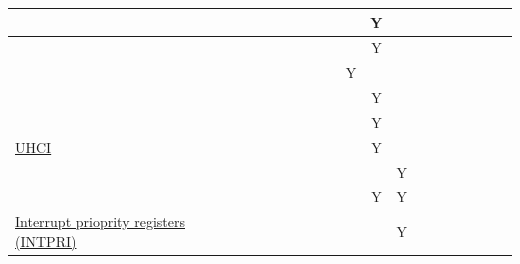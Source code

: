 \documentclass[main\_\_EN.tex]{subfiles}
\begin{document}
\begin{landscape}
\begin{tiny}
\begin{longtable}[c]{|m{3cm}|c|c|c|c|c|c|c|c|c|C{1.4cm}|c|c|c|c|c|c|c|c|c| }
     &  &  &  &  &  &  &  &  &  &  &  Y &  &  &  &  &  &  \\ \hline
     &  &  &  &  &  &  &  &  &  &  &  Y &  &  &  &  &  &  \\ \hline
     &  &  &  &  &  &  &  &  &  &  Y &  &  &  &  &  &  &  \\ \hline
     &  &  &  &  &  &  &  &  &  &  &  Y &  &  &  &  &  &  \\ \hline
     &  &  &  &  &  &  &  &  &  &  &  Y &  &  &  &  &  &  \\ \hline
    \hyperref[mod:uart]{UHCI} &  &  &  &  &  &  &  &  &  &  &  Y &  &  &  &  &  &  \\ \hline
     &  &  &  &  &  &  &  &  &  &  &  &  Y &  &  &  &  &  \\ \hline
      &  &  &  &  &  &  &  &  &  &  & Y & Y &  &  &  &  &  \\ \hline
    \hyperref[mod:riscvcpu]{Interrupt prioprity registers (INTPRI)} &  &  &  &  &  &  &  &  &  &  &  & Y &  &  &  &  &  \\ \hline
\end{longtable}


\begin{longtable}[c]{|m{1.6cm}|c|c|c|c|c|c|c|c|c|C{1.5cm}|c|c|c|c|c|c|c|c|c| }


\end{longtable}
\end{tiny}
\end{landscape}
\end{document}
